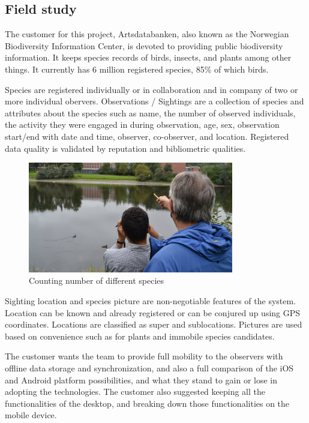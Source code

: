 \subsection{Field study}

The customer for this project, Artsdatabanken, also known as the Norwegian Biodiversity Information Center, is devoted to providing public biodiversity information. It keeps species records of birds, insects, and plants among other things. It currently has 6 million registered species, 85\% of which birds\cite{arts:field-study}. \newline

Species are registered individually or in collaboration and in company of two or more individual obervers. Observations / Sightings are a collection of species and attributes about the species such as name, the number of observed individuals, the activity they were engaged in during observation, age, sex, observation start/end with date and time, observer, co-observer, and location. Registered data quality is validated by reputation and bibliometric qualities.

\begin{figure}[htb]
	\centering
	\includegraphics[width=0.8\textwidth]{prestudy/field_study/field_stud.jpg}
	\caption{Counting number of different species}
	\label{fig:field_study}
\end{figure}

Sighting location and species picture are non-negotiable features of the system. Location can be known and already registered or can be conjured up using GPS coordinates. Locations are classified as super and sublocations. Pictures are used based on convenience such as for plants and immobile species candidates.

The customer wants the team to provide full mobility to the observers with offline data storage and synchronization, and also a full comparison of the iOS and Android platform possibilities, and what they stand to gain or lose in adopting the technologies. The customer also suggested keeping all the functionalities of the desktop, and breaking down those functionalities on the mobile device.

